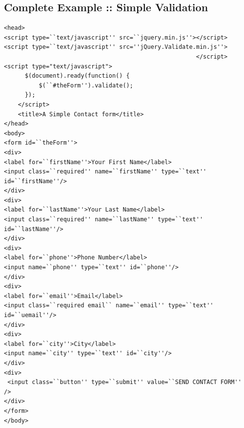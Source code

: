 \documentclass[11pt,a4paper]{article}
\begin{document}
\subsection*{Complete Example :: Simple Validation}
\begin{lstlisting}
<head>
<script type=``text/javascript'' src=``jquery.min.js''></script>
<script type=``text/javascript'' src=''jQuery.Validate.min.js''>
                                                       </script>
<script type="text/javascript">
      $(document).ready(function() {
          $(``#theForm'').validate();
      });
    </script> 
    <title>A Simple Contact form</title>
</head>
<body>
<form id=``theForm''>
<div>
<label for=``firstName''>Your First Name</label>
<input class=``required'' name=``firstName'' type=``text'' id=``firstName''/>
</div>
<div>
<label for=``lastName''>Your Last Name</label>
<input class=``required'' name=``lastName'' type=``text'' id=``lastName''/>
</div>
<div>
<label for=``phone''>Phone Number</label>
<input name=``phone'' type=``text'' id=``phone''/>
</div>
<div>
<label for=``email''>Email</label>
<input class=``required email`` name=``email'' type=``text'' id=``uemail''/>
</div>
<div>
<label for=``city''>City</label>
<input name=``city'' type=``text'' id=``city''/>
</div>
<div>
 <input class=``button'' type=``submit'' value=``SEND CONTACT FORM'' />
</div>
</form>
</body>
\end{lstlisting}
\end{document}

